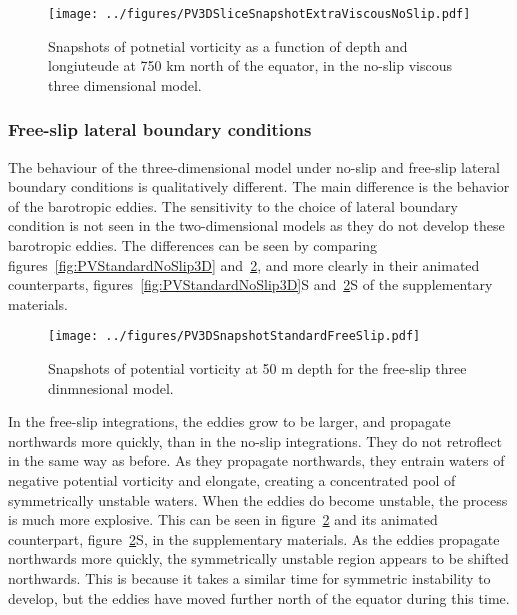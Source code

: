     \begin{figure} 
        \centering
        \texttt{[image: ../figures/PV3DSliceSnapshotExtraViscousNoSlip.pdf]}
        \caption{Snapshots of potnetial vorticity as a function of depth and longiuteude at 750 km north of the equator, in the no-slip viscous three dimensional model.}
        \label{fig:PVatFixedLatForViscous3D}
    \end{figure}

    \subsubsection{Free-slip lateral boundary conditions}
    The behaviour of the three-dimensional model under no-slip and free-slip lateral boundary conditions is qualitatively different. The main difference is the behavior of the barotropic eddies. The sensitivity to the choice of lateral boundary condition is not seen in the two-dimensional models as they do not develop these barotropic eddies. The differences can be seen by comparing figures~\ref{fig:PVStandardNoSlip3D} and~\ref{fig:PV3DSnapshotStandardFreeSlip}, and more clearly in their animated counterparts, figures~\ref{fig:PVStandardNoSlip3D}S and~\ref{fig:PV3DSnapshotStandardFreeSlip}S of the supplementary materials. 
    
    \begin{figure} 
        \centering
        \texttt{[image: ../figures/PV3DSnapshotStandardFreeSlip.pdf]}
        \caption{Snapshots of potential vorticity at 50 m depth for the free-slip three dinmnesional model.}
        \label{fig:PV3DSnapshotStandardFreeSlip}
    \end{figure}

    In the free-slip integrations, the eddies grow to be larger, and propagate northwards more quickly, than in the no-slip integrations. They do not retroflect in the same way as before. As they propagate northwards, they entrain waters of negative potential vorticity and elongate, creating a concentrated pool of symmetrically unstable waters. When the eddies do become unstable, the process is much more explosive. This can be seen in figure~\ref{fig:PV3DSnapshotStandardFreeSlip} and its animated counterpart, figure~\ref{fig:PV3DSnapshotStandardFreeSlip}S, in the supplementary materials. As the eddies propagate northwards more quickly, the symmetrically unstable region appears to be shifted northwards. This is because it takes a similar time for symmetric instability to develop, but the eddies have moved further north of the equator during this time.
    
